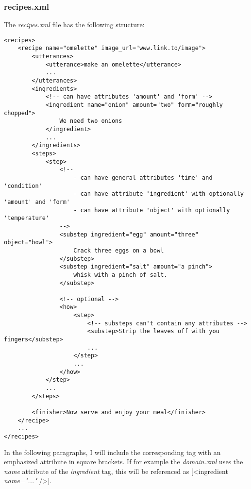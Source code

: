 \documentclass[
	11pt, %
]{fphw}
\begin{document}
\subsubsection*{recipes.xml}
The \emph{recipes.xml} file has the following structure:
\begin{lstlisting}[caption={Example of recipes.xml},captionpos=b]
<recipes>
    <recipe name="omelette" image_url="www.link.to/image">
        <utterances>
            <utterance>make an omelette</utterance>
            ...
        </utterances>
        <ingredients>
            <!-- can have attributes 'amount' and 'form' -->
            <ingredient name="onion" amount="two" form="roughly chopped">
                We need two onions
            </ingredient>
            ...
        </ingredients>
        <steps>
            <step>
                <!-- 
                    - can have general attributes 'time' and 'condition'
                    - can have attribute 'ingredient' with optionally 'amount' and 'form'
                    - can have attribute 'object' with optionally 'temperature'
                -->
                <substep ingredient="egg" amount="three" object="bowl">
                    Crack three eggs on a bowl
                </substep>
                <substep ingredient="salt" amount="a pinch">
                    whisk with a pinch of salt.
                </substep>

                <!-- optional -->
                <how>
                    <step>
                        <!-- substeps can't contain any attributes -->
                        <substep>Strip the leaves off with you fingers</substep>
                        ...
                    </step>
                    ...
                </how>
            </step>
            ...
        </steps>
        
        <finisher>Now serve and enjoy your meal</finisher>
    </recipe>
    ...
</recipes>
\end{lstlisting}

In the following paragraphs, I will include the corresponding tag with an emphasized attribute in square brackets. If for example the \emph{domain.xml} uses the \emph{name} attribute of the \emph{ingredient} tag, this will be referenced as [<ingredient \emph{name="..."} />].
\end{document}
